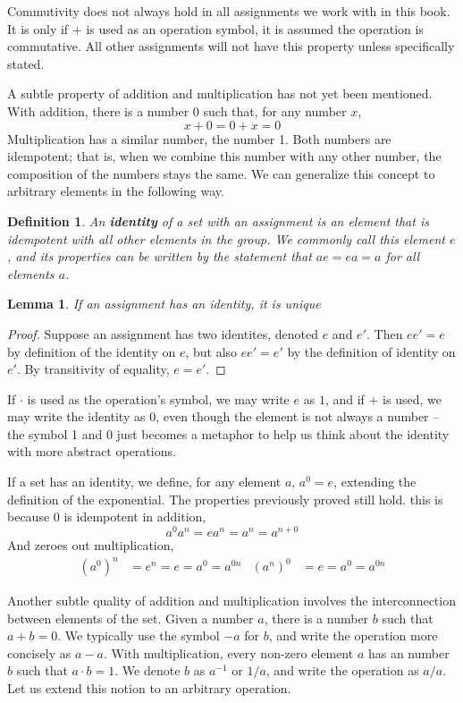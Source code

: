 \documentclass[12pt]{report}
\newtheorem{lemma}[theorem]{Lemma}
\newtheorem{definition}{Definition}
\begin{document}
Commutivity does not always hold in all assignments we work with in this book. It is only if $+$ is used as an operation symbol, it is assumed the operation is commutative. All other assignments will not have this property unless specifically stated.

A subtle property of addition and multiplication has not yet been mentioned. With addition, there is a number 0 such that, for any number $x$,
%
\[x + 0 = 0 + x = 0\]
%
Multiplication has a similar number, the number 1. Both numbers are idempotent; that is, when we combine this number with any other number, the composition of the numbers stays the same. We can generalize this concept to arbitrary elements in the following way.

\begin{definition}
    An {\bf identity} of a set with an assignment is an element that is idempotent with all other elements in the group. We commonly call this element $e$, and its properties can be written by the statement that $ae = ea = a$ for all elements $a$.
\end{definition}

\begin{lemma} If an assignment has an identity, it is unique \end{lemma}
\begin{proof}
    Suppose an assignment has two identites, denoted $e$ and $e'$. Then $ee' = e$ by definition of the identity on $e$, but also $ee' = e'$ by the definition of identity on $e'$. By transitivity of equality, $e = e'$.
\end{proof}

If $\cdotp$ is used as the operation's symbol, we may write $e$ as $1$, and if $+$ is used, we may write the identity as $0$, even though the element is not always a number -- the symbol 1 and 0 just becomes a metaphor to help us think about the identity with more abstract operations.

If a set has an identity, we define, for any element $a$, $a^0 = e$, extending the definition of the exponential. The properties previously proved still hold. this is because $0$ is idempotent in addition,
%
\[a^0 a^n = e a^n = a^n = a^{n+0}\]
%
And zeroes out multiplication,
%
\begin{align*} (a^0)^n &= e^n = e = a^0 = a^{0n} & (a^n)^0 &= e = a^0 = a^{0n} \end{align*}

Another subtle quality of addition and multiplication involves the interconnection between elements of the set. Given a number $a$, there is a number $b$ such that $a + b = 0$. We typically use the symbol $-a$ for $b$, and write the operation more concisely as $a - a$. With multiplication, every non-zero element $a$ has an number $b$ such that $a \cdotp b = 1$. We denote $b$ as $a^{-1}$ or $1/a$, and write the operation as $a/a$. Let us extend this notion to an arbitrary operation.
\end{document}
